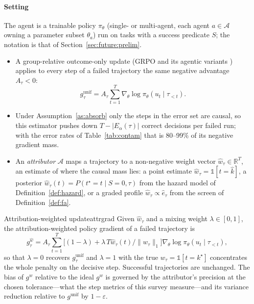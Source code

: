 \documentclass[10pt,a4paper]{article}
\begin{document}
\paragraph{Setting} The agent is a trainable policy $\pi_\theta$ (single- or multi-agent, each agent $a\in\mathcal{A}$ owning a parameter subset $\theta_a$) run on tasks with a success predicate $S$; the notation is that of Section~\ref{sec:future:prelim}.
\begin{itemize}[leftmargin=1.1em]
\item A group-relative outcome-only update (GRPO and its agentic variants \cite{feng2025gigpo}) applies to every step of a failed trajectory the same negative advantage $A_\tau<0$:
\[g^{\mathrm{unif}}_\tau=A_\tau\sum_{t=1}^{T}\nabla_\theta\log\pi_\theta(u_t\mid\tau_{<t}).\]
\item Under Assumption~\ref{as:absorb} only the steps in the error set are causal, so this estimator pushes down $T-|E_\alpha(\tau)|$ correct decisions per failed run; with the error rates of Table~\ref{tab:contam} that is 80--99\% of its negative gradient mass.
\item An \emph{attributor} $\mathcal{A}$ maps a trajectory to a non-negative weight vector $\hat w_\tau\in\mathbb{R}^T$, an estimate of where the causal mass lies: a point estimate $\hat w_\tau=\mathbb{1}[t=\hat k]$, a posterior $\hat w_\tau(t)=P(t^\star{=}t\mid S{=}0,\tau)$ from the hazard model of Definition~\ref{def:hazard}, or a graded profile $\hat w_\tau\propto\hat e_\tau$ from the screen of Definition~\ref{def:fa}.
\end{itemize}

\begin{definition}{Attribution-weighted update}{attrgrad}
Given $\hat w_\tau$ and a mixing weight $\lambda\in[0,1]$, the attribution-weighted policy gradient of a failed trajectory is
\[g^{\hat w}_\tau=A_\tau\sum_{t=1}^{T}\big[(1-\lambda)+\lambda\,T\hat w_\tau(t)/\|\hat w_\tau\|_1\big]\nabla_\theta\log\pi_\theta(u_t\mid\tau_{<t}),\]
so that $\lambda=0$ recovers $g^{\mathrm{unif}}_\tau$ and $\lambda=1$ with the true $w_\tau=\mathbb{1}[t=k^\star]$ concentrates the whole penalty on the decisive step. Successful trajectories are unchanged. The bias of $g^{\hat w}$ relative to the ideal $g^{w}$ is governed by the attributor's precision at the chosen tolerance---what the step metrics of this survey measure---and its variance reduction relative to $g^{\mathrm{unif}}$ by $1-\varepsilon$.
\end{definition}
\end{document}
